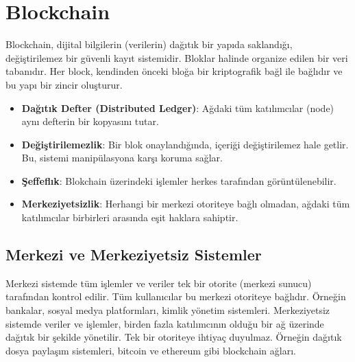 \section{Blockchain}

Blockchain, dijital bilgilerin (verilerin) dağıtık bir yapıda saklandığı, değiştirilemez bir güvenli kayıt sistemidir. Bloklar halinde organize edilen bir veri tabanıdır. Her block, kendinden önceki bloğa bir kriptografik bağl ile bağlıdır ve bu yapı bir zincir oluşturur.

\begin{itemize}
    \item \textbf{Dağıtık Defter (Distributed Ledger)}: Ağdaki tüm katılımcılar (node) aynı defterin bir kopyasını tutar.
    \item \textbf{Değiştirilemezlik}: Bir blok onaylandığında, içeriği değiştirilemez hale getlir. Bu, sistemi manipülasyona karşı koruma sağlar.
    \item \textbf{Şeffeflık}: Blokchain üzerindeki işlemler herkes tarafından görüntülenebilir.
    \item \textbf{Merkeziyetsizlik}: Herhangi bir merkezi otoriteye bağlı olmadan, ağdaki tüm katılımcılar birbirleri arasında eşit haklara sahiptir. 
\end{itemize}

\subsection{Merkezi ve Merkeziyetsiz Sistemler}

Merkezi sistemde tüm işlemler ve veriler tek bir otorite (merkezi sunucu) tarafından kontrol edilir. Tüm kullanıcılar bu merkezi otoriteye bağlıdır. Örneğin bankalar, sosyal medya platformları, kimlik yönetim sistemleri. Merkeziyetsiz sistemde veriler ve işlemler, birden fazla katılımcının olduğu bir ağ üzerinde dağıtık bir şekilde yönetilir. Tek bir otoriteye ihtiyaç duyulmaz. Örneğin dağıtık dosya paylaşım sistemleri, bitcoin ve ethereum gibi blockchain ağları.

